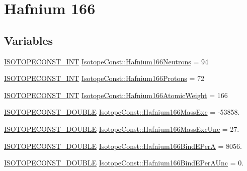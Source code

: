 \hypertarget{group___isotope_const-_hafnium-_hf166}{}\section{Hafnium 166}
\label{group___isotope_const-_hafnium-_hf166}
\subsection*{Variables}
\begin{DoxyCompactItemize}
\item 
\mbox{\hyperlink{group___isotope_const-_macros_ga5f18360b3e99483a35c32d789e62621c}{I\+S\+O\+T\+O\+P\+E\+C\+O\+N\+S\+T\+\_\+\+I\+NT}} \mbox{\hyperlink{group___isotope_const-_hafnium-_hf166_gaee0794cc8d9635bbfa8adbf860c5d315}{Isotope\+Const\+::\+Hafnium166\+Neutrons}} = 94
\item 
\mbox{\hyperlink{group___isotope_const-_macros_ga5f18360b3e99483a35c32d789e62621c}{I\+S\+O\+T\+O\+P\+E\+C\+O\+N\+S\+T\+\_\+\+I\+NT}} \mbox{\hyperlink{group___isotope_const-_hafnium-_hf166_ga22bed5fe359f0a957d3456138bd82ad4}{Isotope\+Const\+::\+Hafnium166\+Protons}} = 72
\item 
\mbox{\hyperlink{group___isotope_const-_macros_ga5f18360b3e99483a35c32d789e62621c}{I\+S\+O\+T\+O\+P\+E\+C\+O\+N\+S\+T\+\_\+\+I\+NT}} \mbox{\hyperlink{group___isotope_const-_hafnium-_hf166_gab4f9c31e8c7b7647ad5155c0b330e7c9}{Isotope\+Const\+::\+Hafnium166\+Atomic\+Weight}} = 166
\item 
\mbox{\hyperlink{group___isotope_const-_macros_ga8f45a7272ce02c0b4c65c44636ed719a}{I\+S\+O\+T\+O\+P\+E\+C\+O\+N\+S\+T\+\_\+\+D\+O\+U\+B\+LE}} \mbox{\hyperlink{group___isotope_const-_hafnium-_hf166_ga50a76d0c3fadf6638e1f6986a3275dd7}{Isotope\+Const\+::\+Hafnium166\+Mass\+Exc}} = -\/53858.
\item 
\mbox{\hyperlink{group___isotope_const-_macros_ga8f45a7272ce02c0b4c65c44636ed719a}{I\+S\+O\+T\+O\+P\+E\+C\+O\+N\+S\+T\+\_\+\+D\+O\+U\+B\+LE}} \mbox{\hyperlink{group___isotope_const-_hafnium-_hf166_gae06bde1c7e7ce992949e9478ebd5bb50}{Isotope\+Const\+::\+Hafnium166\+Mass\+Exc\+Unc}} = 27.
\item 
\mbox{\hyperlink{group___isotope_const-_macros_ga8f45a7272ce02c0b4c65c44636ed719a}{I\+S\+O\+T\+O\+P\+E\+C\+O\+N\+S\+T\+\_\+\+D\+O\+U\+B\+LE}} \mbox{\hyperlink{group___isotope_const-_hafnium-_hf166_ga7a6bd4b231fe3b488c8b034462685ee7}{Isotope\+Const\+::\+Hafnium166\+Bind\+E\+PerA}} = 8056.
\item 
\mbox{\hyperlink{group___isotope_const-_macros_ga8f45a7272ce02c0b4c65c44636ed719a}{I\+S\+O\+T\+O\+P\+E\+C\+O\+N\+S\+T\+\_\+\+D\+O\+U\+B\+LE}} \mbox{\hyperlink{group___isotope_const-_hafnium-_hf166_ga5d70679a1e8515ae2b9719216d6d1836}{Isotope\+Const\+::\+Hafnium166\+Bind\+E\+Per\+A\+Unc}} = 0.

\end{DoxyCompactItemize}
